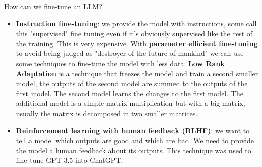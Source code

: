 How can we fine-tune an LLM?
\begin{itemize}
    \item \textbf{Instruction fine-tuning}: we provide the model with instructions, some call this 
    "supervised" fine tuning even if it's obviously supervised like the rest of the training.
    This is very expensive. With \textbf{parameter efficient fine-tuning} to avoid being judged as "destroyer of the future of mankind"
    we can use some techniques to fine-tune the model with less data. \textbf{Low Rank Adaptation} is a 
    technique that freezes the model and train a second smaller model, the outputs of the second model
    are summed to the outputs of the first model. The second model learns the changes to the first model.
    The additional model is a simple matrix multiplication but with a big matrix, usually the matrix is
    decomposed in two smaller matrices.
    \item \textbf{Reinforcement learning with human feedback (RLHF)}: we want to tell a model which outputs are good and which are bad.
    We need to provide the model a human feedback about its outputs. This technique was used to fine-tune GPT-3.5
    into ChatGPT.
\end{itemize}
